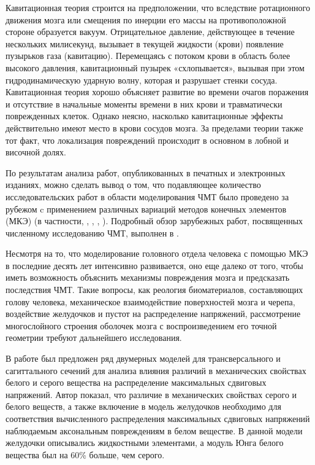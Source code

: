 Кавитационная теория строится на предположении, что вследствие ротационного движения мозга или смещения по инерции его массы на противоположной стороне образуется вакуум. Отрицательное давление, действующее в течение нескольких милисекунд, вызывает в текущей жидкости (крови) появление пузырьков газа (кавитацию). Перемещаясь с потоком крови в область более высокого давления, кавитационный пузырек «схлопывается», вызывая при этом гидродинамическую ударную волну, которая и разрушает стенки сосуда. Кавитационная теория хорошо объясняет развитие во времени очагов поражения и отсутствие в начальные моменты времени в них крови и травматически поврежденных клеток. Однако неясно, насколько кавитационные эффекты действительно имеют место в крови сосудов мозга. За пределами теории также тот факт, что локализация повреждений происходит в основном в лобной и височной долях.

По результатам анализа работ, опубликованных в печатных и электронных изданиях, можно сделать вывод о том, что подавляющее количество исследовательских работ в области моделирования ЧМТ было проведено за рубежом c применением различных вариаций методов конечных элементов (МКЭ) (в частности, \cite{nahum}, \cite{ueno}, \cite{ruan}, \cite{willinger}). Подробный обзор зарубежных работ, посвященных численному исследованию ЧМТ, выполнен в \cite{agapov_diser}.

Несмотря на то, что моделирование головного отдела человека с помощью МКЭ в последние десять лет интенсивно развивается, оно еще далеко от того, чтобы иметь возможность объяснить механизмы повреждения мозга и предсказать последствия ЧМТ. Такие вопросы, как реология биоматериалов, составляющих голову человека, механическое взаимодействие поверхностей мозга и черепа, воздействие желудочков и пустот на распределение напряжений, рассмотрение многослойного строения оболочек мозга с воспроизведением его точной геометрии требуют дальнейшего исследования. 

В работе \cite{zhou} был предложен ряд двумерных моделей для трансверсального и сагиттального сечений для анализа влияния различий в механических свойствах белого и серого вещества на распределение максимальных сдвиговых напряжений. Автор показал, что различие в механических свойствах серого и белого веществ, а также включение в модель желудочков необходимо для соответствия вычисленного распределения максимальных сдвиговых напряжений наблюдаемым аксональным повреждениям в белом веществе. В данной модели желудочки описывались жидкостными элементами, а модуль Юнга белого вещества был на 60\% больше, чем серого. 

